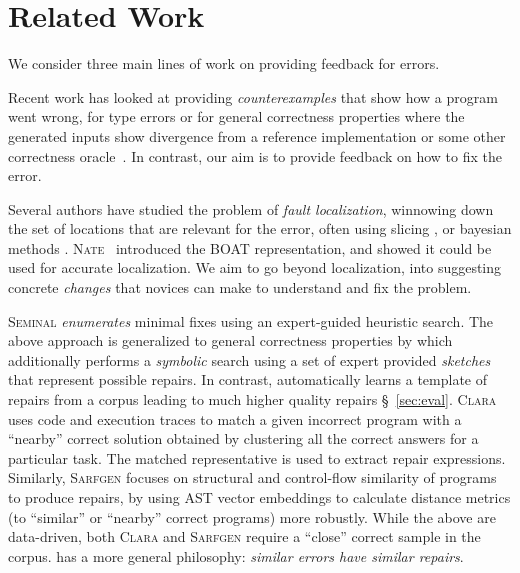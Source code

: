 \section{Related Work}
\label{sec:related-work}

We consider three main lines of work on providing feedback for errors.

%
Recent work has looked at providing \emph{counterexamples} 
that show how a program went wrong, for type errors 
\cite{Seidel2016-ul} or for general correctness properties 
where the generated inputs show divergence from a reference 
implementation or some other correctness oracle~\cite{Song_2019}.
In contrast, our aim is to provide feedback on how to fix the error.

 Several authors have studied 
the problem of \emph{fault localization}, \ie winnowing down 
the set of locations that are relevant for the error, often 
using slicing \citep{Wand1986-nw,Haack2003-vc,Tip2001-qp,Rahli2015-tt},
or bayesian methods \citep{Zhang2014-lv}. 
%
\textsc{Nate}~\citep{Seidel:2017} introduced the BOAT representation, 
and showed it could be used for accurate localization.
%
We aim to go beyond localization, into suggesting concrete 
\emph{changes} that novices can make to understand and fix 
the problem.

%
\textsc{Seminal} \citep{Lerner2007-dt} \emph{enumerates} minimal fixes 
using an expert-guided heuristic search. 
%
The above approach is generalized to general correctness properties 
by \cite{singh2013} which additionally performs a \emph{symbolic} 
search using a set of expert provided \emph{sketches} that represent 
possible repairs. 
%
In contrast, \toolname automatically learns a template of repairs 
from a corpus leading to much higher quality repairs \S~\ref{sec:eval}.
%
\textsc{Clara} \citep{Gulwani_2018} uses code and execution traces 
to match a given incorrect program with a ``nearby'' correct solution 
obtained by clustering all the correct answers for a particular task.
The matched representative is used to extract repair expressions. 
%
Similarly, \textsc{Sarfgen} \citep{Wang_2018} focuses on structural 
and control-flow similarity of programs to produce repairs, by using 
AST vector embeddings to calculate distance metrics (to ``similar'' 
or ``nearby'' correct programs) more robustly.
%
While the above are data-driven, both \textsc{Clara} and \textsc{Sarfgen} 
require a ``close'' correct sample in the corpus. 
%
\toolname has a more general philosophy: \emph{similar errors have similar repairs}.


